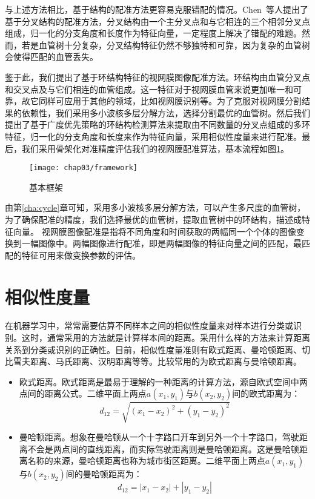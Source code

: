与上述方法相比，基于结构的配准方法更容易克服错配的情况。Chen~\cite{chen2011retinal,chen2015retinal}等人提出了基于分叉结构的配准方法，分叉结构由一个主分叉点和与它相连的三个相邻分叉点组成，归一化的分支角度和长度作为特征向量，一定程度上解决了错配的难题。然而，若是血管树十分复杂，分叉结构特征仍然不够独特和可靠，因为复杂的血管树会使得匹配的血管丢失。

鉴于此，我们提出了基于环结构特征的视网膜图像配准方法。环结构由血管分叉点和交叉点及与它们相连的血管组成。这一特征对于视网膜血管来说更加唯一和可靠，故它同样可应用于其他的领域，比如视网膜识别等。为了克服对视网膜分割结果的依赖性，我们采用多小波核多层分解方法，选择分割最优的血管树。然后我们提出了基于广度优先策略的环结构检测算法来提取由不同数量的分叉点组成的多环特征，归一化的分支角度和长度来作为特征向量，采用相似性度量来进行配准。最后，我们采用骨架化对准精度评估我们的视网膜配准算法，基本流程如图\ref{fig:framework}。
\begin{figure}
  \centering
  \texttt{[image: chap03/framework]}
  \caption{基本框架}
  \label{fig:framework}
\end{figure}


由第\ref{cha:cycle}章可知，采用多小波核多层分解方法，可以产生多尺度的血管树，为了确保配准的精度，我们选择最优的血管树，提取血管树中的环结构，描述成特征向量。
视网膜图像配准是指将不同角度和时间获取的两幅同一个个体的图像变换到一幅图像中。两幅图像进行配准，即是两幅图像的特征向量之间的匹配，最匹配的特征可用来做变换参数的评估。


\section{相似性度量}
\label{cha:similarity}

在机器学习中，常常需要估算不同样本之间的相似性度量来对样本进行分类或识别。这时，通常采用的方法就是计算样本间的距离。采用什么样的方法来计算距离关系到分类或识别的正确性。目前，相似性度量准则有欧式距离、曼哈顿距离、切比雪夫距离、马氏距离、汉明距离等等。比较常用的为欧式距离与曼哈顿距离。

\begin{itemize}
\item 欧式距离。欧式距离是最易于理解的一种距离的计算方法，源自欧式空间中两点间的距离公式。二维平面上两点$a(x_1,y_1)$与$b(x_2,y_2)$间的欧式距离为：
\begin{equation}
d_{12}=\sqrt{(x_1-x_2)^2+(y_1-y_2)^2}
\end{equation}
\item 曼哈顿距离。想象在曼哈顿从一个十字路口开车到另外一个十字路口，驾驶距离不会是两点间的直线距离，而实际驾驶距离则是曼哈顿距离。这是曼哈顿距离名称的来源，曼哈顿距离也称为城市街区距离。二维平面上两点$a(x_1,y_1)$与$b(x_2,y_2)$间的曼哈顿距离为：
\begin{equation}
d_{12}=|x_1-x_2|+|y_1-y_2|
\end{equation}
\end{itemize}

